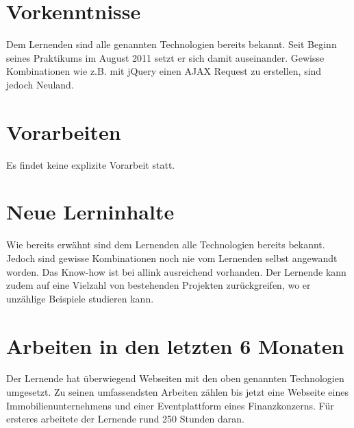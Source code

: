 \section{Vorkenntnisse}
Dem Lernenden sind alle genannten Technologien bereits bekannt. Seit Beginn seines Praktikums im August 2011 setzt er sich damit auseinander. Gewisse Kombinationen wie z.B. mit jQuery einen AJAX Request zu erstellen, sind jedoch Neuland. 
    
\section{Vorarbeiten}
Es findet keine explizite Vorarbeit statt. 
    
\section{Neue Lerninhalte}
Wie bereits erwähnt sind dem Lernenden alle Technologien bereits bekannt. Jedoch sind gewisse Kombinationen noch nie vom Lernenden selbst angewandt worden. Das Know-how ist bei allink ausreichend vorhanden. Der Lernende kann zudem auf eine Vielzahl von bestehenden Projekten zurückgreifen, wo er unzählige Beispiele studieren kann. 
    
\section{Arbeiten in den letzten 6 Monaten}
Der Lernende hat überwiegend Webseiten mit den oben genannten Technologien umgesetzt. Zu seinen umfassendsten Arbeiten zählen bis jetzt eine Webseite eines Immobilienunternehmens und einer Eventplattform eines Finanzkonzerns. Für ersteres arbeitete der Lernende rund 250 Stunden daran. 
